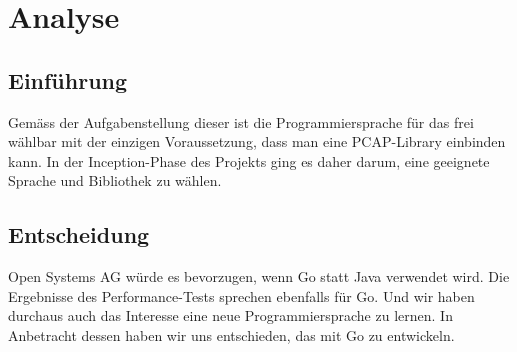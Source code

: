 \chapter{Analyse}
\label{chap:Analyse}


\section{Einführung}
Gemäss der Aufgabenstellung dieser \work{} ist die Programmiersprache für das \tool{} frei wählbar mit der einzigen Voraussetzung, dass man eine \acs{PCAP}-Library einbinden kann. In der Inception-Phase des Projekts ging es daher darum, eine geeignete Sprache und Bibliothek zu wählen.







\section{Entscheidung}
Open Systems AG würde es bevorzugen, wenn Go statt Java verwendet wird. Die Ergebnisse des Performance-Tests sprechen ebenfalls für Go. Und wir haben durchaus auch das Interesse  eine neue Programmiersprache zu lernen.
In Anbetracht dessen haben wir uns entschieden, das \tool{} mit Go zu entwickeln.



